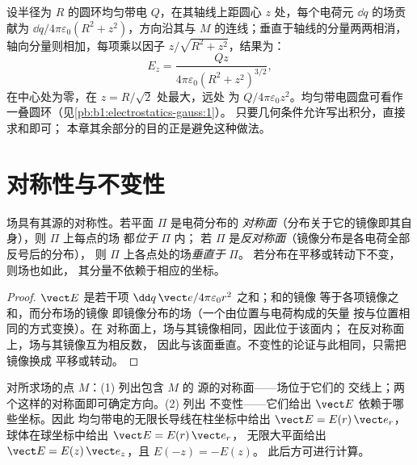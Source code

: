 \begin{example}\label{ex:b1:electrostatics-gauss:ring}
设半径为 $R$ 的圆环均匀带电 $Q$，在其轴线上距圆心
$z$ 处，每个电荷元 $\dd q$ 的场贡献为 $\dd q/4\pi\varepsilon_0(R^2 +
z^2)$，方向沿其与 $M$ 的连线；垂直于轴线的分量两两相消，
轴向分量则相加，每项乘以因子
$z/\sqrt{R^2 + z^2}$，结果为：
\[
E_z = \frac{Qz}{4\pi\varepsilon_0(R^2 + z^2)^{3/2}} ,
\]
在中心处为零，在 $z = R/\sqrt2$ 处最大，远处
为 $Q/4\pi\varepsilon_0z^2$。均匀带电圆盘可看作一叠圆环（见\cref{pb:b1:electrostatics-gauss:1}）。
只要几何条件允许写出积分，直接求和即可；
本章其余部分的目的正是避免这种做法。
\end{example}

\section{对称性与不变性}

\begin{proposition}[对称性原理]\label{prop:b1:electrostatics-gauss:symmetry}
场具有其源的对称性。若平面 $\Pi$ 是电荷分布的
\emph{对称面}（分布关于它的镜像即其自身），则 $\Pi$ 上每点的场
都\emph{位于} $\Pi$ 内；
若 $\Pi$ 是\emph{反对称面}（镜像分布是各电荷全部反号后的分布），
则 $\Pi$ 上各点处的场\emph{垂直于} $\Pi$。
若分布在平移或转动下不变，
则场也如此，
其分量不依赖于相应的坐标。
\end{proposition}

\begin{proof}
$\vect E$ 是若干项 $\dd q\,\vect e/4\pi\varepsilon_0r^2$ 之和；和的镜像
等于各项镜像之和，而分布场的镜像
即镜像分布的场（一个由位置与电荷构成的矢量
按与位置相同的方式变换）。在
对称面上，场与其镜像相同，因此位于该面内；
在反对称面上，场与其镜像互为相反数，
因此与该面垂直。不变性的论证与此相同，只需把镜像换成
平移或转动。
\end{proof}

\begin{method}[计算前先确定场的形状]\label{meth:b1:electrostatics-gauss:symmetry}
对所求场的点 $M$：(1) 列出包含 $M$ 的
源的对称面——场位于它们的
交线上；两个这样的对称面即可确定方向。(2) 列出
不变性——它们给出 $\vect E$ 依赖于哪些坐标。因此
均匀带电的无限长导线在柱坐标中给出 $\vect E = E(r)\,\vect e_r$，
球体在球坐标中给出 $\vect E = E(r)\,\vect e_r$，
无限大平面给出 $\vect E = E(z)\,\vect e_z$，且 $E(-z) = -E(z)$。
此后方可进行计算。
\end{method}

